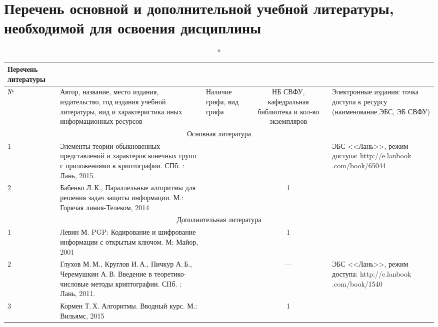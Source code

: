\documentclass[a4paper,12pt]{article}
\begin{document}
\newpage
\section{Перечень основной и дополнительной учебной литературы, необходимой для освоения дисциплины}

  \begin{longtable}{|l|p{7cm}|p{18mm}|c|p{32mm}|}
  \caption*{Перечень литературы}\\
  \hline
  № & 
  \centering\small\arraybackslash Автор, название, место издания, издательство, год издания учебной литературы, вид и характеристика иных информационных ресурсов &
  \multicolumn{1}{p{18mm}|}{\centering\small\arraybackslash Наличие грифа, вид грифа} &
  \multicolumn{1}{p{21mm}|}{\centering\small\arraybackslash НБ СВФУ, кафедральная библиотека и кол-во экземпляров} & 
  \centering\small\arraybackslash Электронные издания: точка доступа к ресурсу (наименование ЭБС, ЭБ СВФУ)\\
  \hline
  \multicolumn{5}{|c|}{Основная литература}\\
  \hline
  1 &\raggedright\arraybackslash Элементы теории обыкновенных представлений и характеров конечных групп с приложениями в криптографии.  СПб. : Лань, 2015.  &   &  ---  &  ЭБС <<Лань>>, режим доступа: http://e.lanbook .com/book/65044 
  \\
  \hline
  2 &\raggedright\arraybackslash Бабенко Л.\,К., Параллельные алгоритмы для решения задач защиты информации. М.: Горячая линия-Телеком, 2014  &   &  1  &  
  \\
  \hline
  
  \multicolumn{5}{|c|}{Дополнительная литература}\\
  \hline
  1 &\raggedright\arraybackslash Левин М. PGP: Кодирование и шифрование информации с открытым ключом. М: Майор, 2001                    &   &  1  &  
  \\
  \hline
  2 &\raggedright\arraybackslash Глухов М.\,М., Круглов И.\,А., Пичкур А.\,Б., Черемушкин А.\,В. Введение в теоретико-числовые методы криптографии. СПб. : Лань, 2011. &   & --- &  ЭБС <<Лань>>, режим доступа: http://e.lanbook .com/book/1540 
  \\
  \hline
  3 &\raggedright\arraybackslash Кормен Т.\,Х. Алгоритмы. Вводный курс. М.: Вильямс, 2015                                                     &   &  1  &  
  \\
  \hline
  
  \end{longtable}
  
\end{document}
